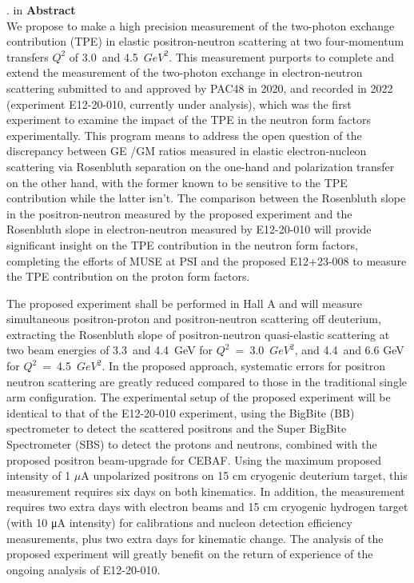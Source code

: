 {. in {\large {\bf Abstract}}} \\


We propose to make a high precision measurement of the two-photon exchange contribution (TPE) in elastic positron-neutron scattering at two four-momentum transfers $Q^2$ of 3.0~and 4.5~$GeV^2$. This measurement purports to complete and extend the measurement of the two-photon exchange in electron-neutron scattering submitted to and approved by PAC48 in 2020, and recorded in 2022 (experiment E12-20-010, currently under analysis), which was the first experiment to examine the impact of the TPE in the neutron form factors experimentally. This program means to address the open question of the discrepancy between GE /GM ratios measured in elastic electron-nucleon scattering via Rosenbluth separation on the one-hand and polarization transfer on the other hand, with the former known to be sensitive to the TPE contribution while the latter isn’t.
The comparison between the Rosenbluth slope in the positron-neutron measured by the proposed experiment and the Rosenbluth slope in electron-neutron measured by E12-20-010 will provide significant insight on the TPE contribution in the neutron form factors, completing the efforts of MUSE at PSI and the proposed E12+23-008 to measure the TPE contribution on the proton form factors.

The proposed experiment shall be performed in Hall A and will measure simultaneous positron-proton and positron-neutron scattering off deuterium, extracting the Rosenbluth slope of positron-neutron quasi-elastic scattering at two beam energies of 3.3~and 4.4~GeV for $Q^2$~=~3.0~$GeV^2$, and 4.4~and 6.6 GeV for $Q^2$~=~4.5~$GeV^2$. In the proposed approach, systematic errors for positron neutron scattering are greatly reduced compared to those in the traditional single arm configuration.
The experimental setup of the proposed experiment will be identical to that of the E12-20-010 experiment, using the BigBite (BB) spectrometer to detect the scattered positrons and the Super BigBite Spectrometer (SBS) to detect the protons and neutrons, combined with the proposed positron beam-upgrade for CEBAF. Using the maximum proposed intensity of 1 $\mu$A unpolarized positrons on 15 cm cryogenic deuterium target, this measurement requires six days on both kinematics.
In addition, the measurement requires two extra days with electron beams and 15 cm cryogenic hydrogen target (with 10 μA intensity) for calibrations and nucleon detection efficiency measurements, plus two extra days for kinematic change. The analysis of the proposed experiment will greatly benefit on the return of experience of the ongoing analysis of E12-20-010.


